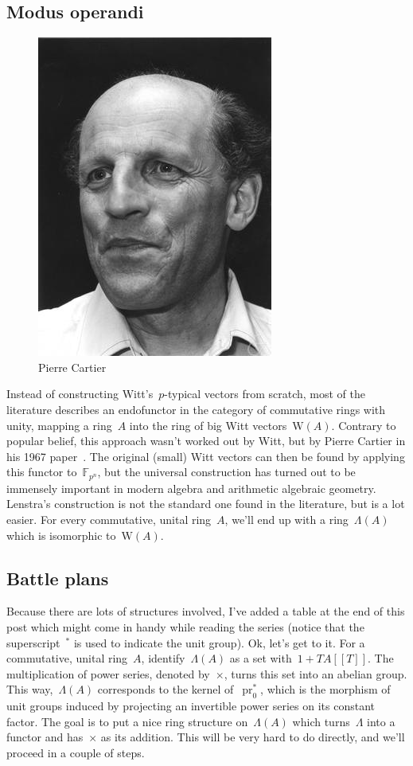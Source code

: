 \subsection{Modus operandi}
\begin{figure}
  \centering
  \includegraphics[width=.3\textwidth]{playing-witt-rings/cartier}
  \caption{Pierre Cartier}
\end{figure}
Instead of constructing Witt's~$p$-typical vectors from scratch, most of the literature describes an endofunctor in the category of commutative rings with unity, mapping a ring~$A$ into the ring of big Witt vectors~$\mathrm{W}(A)$. Contrary to popular belief, this approach wasn't worked out by Witt, but by Pierre Cartier in his 1967 paper~\cite{cartier}. The original (small) Witt vectors can then be found by applying this functor to~$\mathbb{F}_{p^{n}}$, but the universal construction has turned out to be immensely important in modern algebra and arithmetic algebraic geometry. Lenstra's construction is not the standard one found in the literature, but is a lot easier. For every commutative, unital ring~$A$, we'll end up with a ring~$\Lambda(A)$ which is isomorphic to~$\mathrm{W}(A)$.

\subsection{Battle plans}
Because there are lots of structures involved, I've added a table at the end of this post which might come in handy while reading the series (notice that the superscript~$^{*}$ is used to indicate the unit group). Ok, let's get to it. For a commutative, unital ring~$A$, identify~$\Lambda(A)$ as a set with~$1+TA[\![T]\!]$. The multiplication of power series, denoted by~$\times$, turns this set into an abelian group. This way,~$\Lambda(A)$ corresponds to the kernel of~$\operatorname{pr}_{0}^{*}$, which is the morphism of unit groups induced by projecting an invertible power series on its constant factor. The goal is to put a nice ring structure on~$\Lambda(A)$ which turns~$\Lambda$ into a functor and has~$\times$ as its addition. This will be very hard to do directly, and we'll proceed in a couple of steps.

